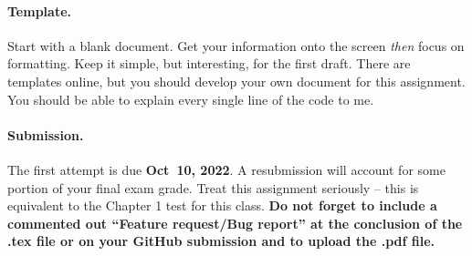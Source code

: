 \documentclass[11pt]{article}
\begin{document}
\paragraph{Template.} Start with a blank document.  Get your information onto the screen \textit{then} focus on formatting.  Keep it simple, but interesting, for the first draft.   There are templates online, but you should develop your own document for this assignment.  You should be able to explain every single line of the code to me.

\paragraph{Submission.} The first attempt is due \textbf{Oct~10, 2022}.  A resubmission will account for some portion of your final exam grade.  Treat this assignment seriously -- this is equivalent to the Chapter 1 test for this   class.  \textbf{Do not forget to include a commented out ``Feature request/Bug report'' at the conclusion of the .tex file or on your GitHub submission and to upload the .pdf file.}  
\end{document}

